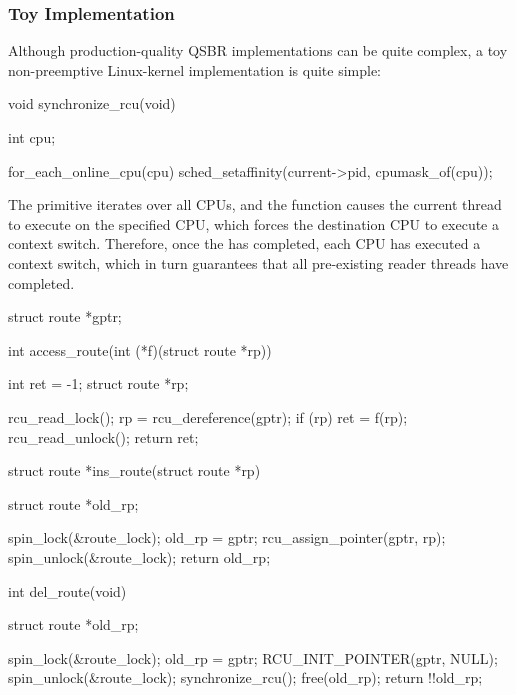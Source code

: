 \subsubsection{Toy Implementation}
\label{sec:defer:Toy Implementation}

Although production-quality QSBR implementations can be quite complex,
a toy non-preemptive Linux-kernel implementation is quite simple:

\begin{VerbatimN}[samepage=true]
void synchronize_rcu(void)
{
	int cpu;

	for_each_online_cpu(cpu)
		sched_setaffinity(current->pid, cpumask_of(cpu));
}
\end{VerbatimN}

The  primitive iterates over all CPUs, and
the  function causes the current thread to
execute on the specified CPU, which forces the destination CPU to execute
a context switch.
Therefore, once the  has completed, each CPU
has executed a context switch, which in turn guarantees that
all pre-existing reader threads have completed.

\begin{listing}
\begin{fcvlabel}
\begin{VerbatimL}[commandchars=\\\[\]]
struct route *gptr;

int access_route(int (*f)(struct route *rp))
{
	int ret = -1;
	struct route *rp;

	rcu_read_lock();
	rp = rcu_dereference(gptr);
	if (rp)
		ret = f(rp);		\lnlbl[access_rp]
	rcu_read_unlock();
	return ret;
}

struct route *ins_route(struct route *rp)
{
	struct route *old_rp;

	spin_lock(&route_lock);
	old_rp = gptr;
	rcu_assign_pointer(gptr, rp);
	spin_unlock(&route_lock);
	return old_rp;
}

int del_route(void)
{
	struct route *old_rp;

	spin_lock(&route_lock);
	old_rp = gptr;
	RCU_INIT_POINTER(gptr, NULL);
	spin_unlock(&route_lock);
	synchronize_rcu();
	free(old_rp);
	return !!old_rp;
}
\end{VerbatimL}
\end{fcvlabel}
\caption{Insertion and Deletion With Concurrent Readers}
\label{lst:defer:Insertion and Deletion With Concurrent Readers}
\end{listing}

